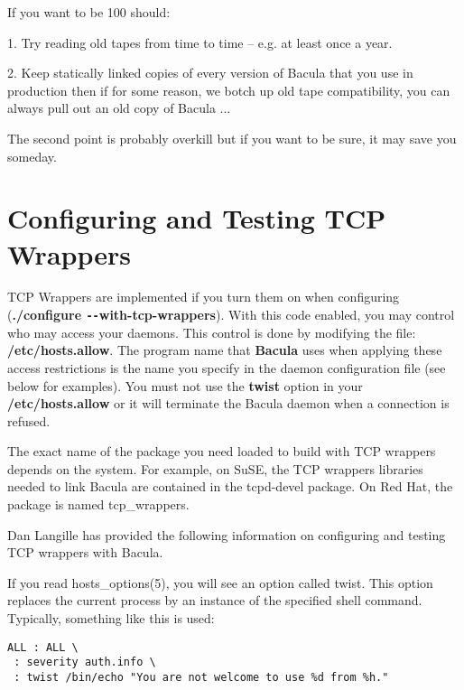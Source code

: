 If you want to be 100%
should:

1. Try reading old tapes from time to time -- e.g. at least once
a year.

2. Keep statically linked copies of every version of Bacula that you use
in production then if for some reason, we botch up old tape compatibility, you
can always pull out an old copy of Bacula ...

The second point is probably overkill but if you want to be sure, it may
save you someday.



\label{wrappers}
\section{Configuring and Testing TCP Wrappers}

TCP Wrappers are implemented if you turn them on when configuring
({\bf ./configure \verb:--:with-tcp-wrappers}). 
With this code enabled, you may control who may access your
daemons.  This control is done by modifying the file: {\bf
/etc/hosts.allow}.  The program name that {\bf Bacula} uses when
applying these access restrictions is the name you specify in the
daemon configuration file (see below for examples).
You must not use the {\bf twist} option in your {\bf
/etc/hosts.allow} or it will terminate the Bacula daemon when a
connection is refused.

The exact name of the package you need loaded to build with TCP wrappers
depends on the system.  For example,
on SuSE, the TCP wrappers libraries needed to link Bacula are
contained in the tcpd-devel package. On Red Hat, the package is named
tcp\_wrappers.

Dan Langille has provided the following information on configuring and
testing TCP wrappers with Bacula. 

If you read hosts\_options(5), you will see an option called twist. This
option replaces the current process by an instance of the specified shell
command. Typically, something like this is used: 

\footnotesize
\begin{verbatim}
ALL : ALL \
 : severity auth.info \
 : twist /bin/echo "You are not welcome to use %d from %h."
\end{verbatim}
\normalsize

